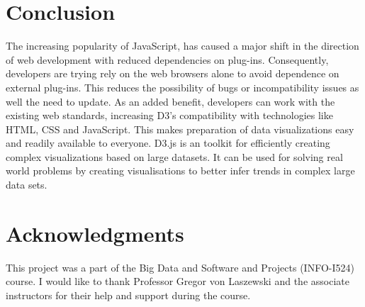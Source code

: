 \documentclass[9pt,twocolumn,twoside]{styles/osajnl}
\begin{document}
\section{Conclusion}
The increasing popularity of JavaScript, has caused a major shift in the direction of web development with reduced dependencies on plug-ins. Consequently, developers are trying rely on the web browsers alone to avoid dependence on external plug-ins. This reduces the possibility of bugs or incompatibility issues as well the need to update. As an added benefit, developers can work with the existing web standards, increasing D3’s compatibility with technologies like HTML, CSS and JavaScript. This makes preparation of data visualizations easy and readily available to everyone. D3.js is an toolkit for efficiently creating complex visualizations based on large datasets. It can be used for solving real world problems by creating visualisations to better infer trends in complex large data sets.

\section{Acknowledgments}
This project was a part of the Big Data and Software and Projects (INFO-I524) course. I would like to thank Professor Gregor von Laszewski and the associate instructors for their help and support during the course. 


\end{document}
